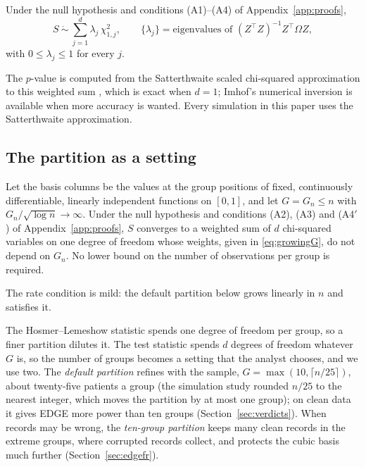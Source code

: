 \begin{theorem}\label{thm:null}
Under the null hypothesis and conditions (A1)--(A4) of Appendix~\ref{app:proofs},
\begin{equation}\label{eq:wchi2}
  S\ \dot\sim\ \sum_{j=1}^{d}\lambda_j\,\chi^2_{1,j},\qquad
  \{\lambda_j\}=\text{eigenvalues of }(Z^\top Z)^{-1}Z^\top\Omega Z ,
\end{equation}
with $0\le\lambda_j\le1$ for every $j$.
\end{theorem}

The $p$-value is computed from the Satterthwaite scaled chi-squared approximation to this weighted
sum \citep{satterthwaite1946}, which is exact when $d=1$; Imhof's numerical inversion \citep{imhof1961}
is available when more accuracy is wanted. Every simulation in this paper uses the Satterthwaite
approximation.

\subsection{The partition as a setting}\label{sec:partitionchoice}

\begin{theorem}\label{thm:growingG}
Let the basis columns be the values at the group positions of fixed, continuously differentiable,
linearly independent functions on $[0,1]$, and let $G=G_n\le n$ with $G_n/\sqrt{\log n}\to\infty$.
Under the null hypothesis and conditions (A2), (A3) and (A4$'$) of Appendix~\ref{app:proofs}, $S$
converges to a weighted sum of $d$ chi-squared variables on one degree of freedom whose weights, given
in \eqref{eq:growingG}, do not depend on $G_n$. No lower bound on the number of observations per
group is required.
\end{theorem}

The rate condition is mild: the default partition below grows linearly in $n$ and satisfies it.

The Hosmer--Lemeshow statistic spends one degree of freedom per group, so a finer partition dilutes
it. The test statistic spends $d$ degrees of freedom whatever $G$ is, so the number of groups
becomes a setting that the analyst chooses, and we use two. The \emph{default partition} refines with
the sample, $G=\max(10,\lceil n/25\rceil)$, about twenty-five patients a group (the simulation study
rounded $n/25$ to the nearest integer, which moves the partition by at most one group); on clean data it gives
EDGE more power than ten groups (Section~\ref{sec:verdicts}). When records may be wrong,
the \emph{ten-group partition} keeps many clean records in the extreme groups, where corrupted records
collect, and protects the cubic basis much further (Section~\ref{sec:edgefr}).
